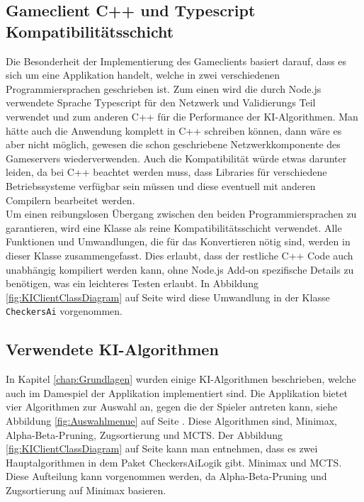 \documentclass[12pt,a4paper,bibliography=totocnumbered,listof=totocnumbered]{article}
\begin{document}
\subsection{Gameclient C++ und Typescript Kompatibilitätsschicht}
Die Besonderheit der Implementierung des Gameclients basiert darauf, dass es sich um eine Applikation handelt, welche in zwei verschiedenen 
Programmiersprachen geschrieben ist. Zum einen wird die durch Node.js verwendete Sprache Typescript für den Netzwerk und Validierungs Teil 
verwendet und zum anderen C++ für die Performance der \ac{KI}-Algorithmen. Man hätte auch die Anwendung komplett in C++ schreiben können,  
dann wäre es aber nicht möglich, gewesen die schon geschriebene Netzwerkkomponente des Gameservers wiederverwenden. Auch die Kompatibilität würde etwas darunter leiden, da 
bei C++ beachtet werden muss, dass Libraries für verschiedene Betriebssysteme verfügbar sein müssen und diese eventuell mit anderen 
Compilern bearbeitet werden. 
\\
Um einen reibungslosen Übergang zwischen den beiden Programmiersprachen zu garantieren, wird eine Klasse als reine Kompatibilitätsschicht verwendet.
Alle Funktionen und Umwandlungen, die für das Konvertieren nötig sind, werden in dieser Klasse zusammengefasst. Dies erlaubt, dass der restliche 
C++ Code auch unabhängig kompiliert werden kann, ohne Node.js Add-on spezifische Details zu benötigen, was ein leichteres Testen erlaubt.
In Abbildung \ref{fig:KIClientClassDiagram} auf Seite \pageref{fig:KIClientClassDiagram} wird diese Umwandlung in der Klasse \texttt{CheckersAi} 
vorgenommen.

\subsection{Verwendete \ac{KI}-Algorithmen}
\label{chap:KIAlgorithms}
In Kapitel \ref{chap:Grundlagen} wurden einige \ac{KI}-Algorithmen beschrieben, welche auch im Damespiel der Applikation implementiert sind.
Die Applikation bietet vier Algorithmen zur Auswahl an, gegen die der Spieler antreten kann, siehe Abbildung \ref{fig:Auswahlmenue} auf Seite \pageref{fig:Auswahlmenue}. 
Diese Algorithmen sind, Minimax, Alpha-Beta-Pruning, Zugsortierung und \ac{MCTS}.
Der Abbildung \ref{fig:KIClientClassDiagram} auf Seite \pageref{fig:KIClientClassDiagram}
kann man entnehmen, dass es zwei Hauptalgorithmen in dem Paket CheckersAiLogik gibt. Minimax und \ac{MCTS}. Diese Aufteilung kann vorgenommen werden,
da Alpha-Beta-Pruning und Zugsortierung auf Minimax basieren.
\end{document}
